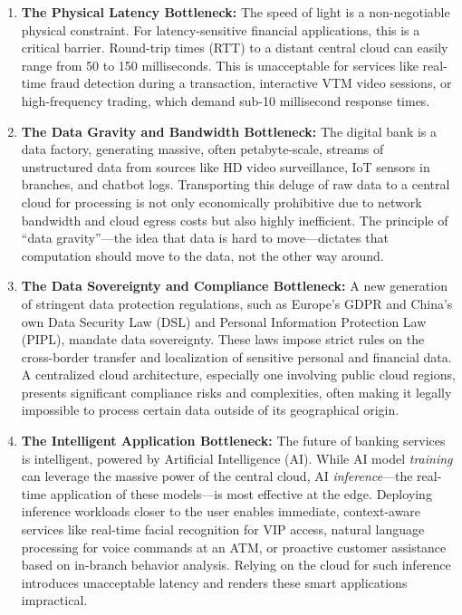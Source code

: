 \documentclass[11pt,a4paper]{article}
\begin{document}
\begin{enumerate}
  \item \textbf{The Physical Latency Bottleneck:} The speed of light is a non-negotiable physical constraint. For latency-sensitive financial applications, this is a critical barrier. Round-trip times (RTT) to a distant central cloud can easily range from 50 to 150 milliseconds. This is unacceptable for services like real-time fraud detection during a transaction, interactive VTM video sessions, or high-frequency trading, which demand sub-10 millisecond response times.
  \item \textbf{The Data Gravity and Bandwidth Bottleneck:} The digital bank is a data factory, generating massive, often petabyte-scale, streams of unstructured data from sources like HD video surveillance, IoT sensors in branches, and chatbot logs. Transporting this deluge of raw data to a central cloud for processing is not only economically prohibitive due to network bandwidth and cloud egress costs but also highly inefficient. The principle of ``data gravity''---the idea that data is hard to move---dictates that computation should move to the data, not the other way around.
  \item \textbf{The Data Sovereignty and Compliance Bottleneck:} A new generation of stringent data protection regulations, such as Europe's GDPR and China's own Data Security Law (DSL) and Personal Information Protection Law (PIPL), mandate data sovereignty. These laws impose strict rules on the cross-border transfer and localization of sensitive personal and financial data. A centralized cloud architecture, especially one involving public cloud regions, presents significant compliance risks and complexities, often making it legally impossible to process certain data outside of its geographical origin.
  \item \textbf{The Intelligent Application Bottleneck:} The future of banking services is intelligent, powered by Artificial Intelligence (AI). While AI model \textit{training} can leverage the massive power of the central cloud, AI \textit{inference}---the real-time application of these models---is most effective at the edge. Deploying inference workloads closer to the user enables immediate, context-aware services like real-time facial recognition for VIP access, natural language processing for voice commands at an ATM, or proactive customer assistance based on in-branch behavior analysis. Relying on the cloud for such inference introduces unacceptable latency and renders these smart applications impractical.
\end{enumerate}
\end{document}
